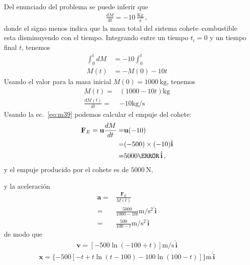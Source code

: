 Del enunciado del problema se puede inferir que
\begin{align}
  \frac{dM}{dt}=-10\ \frac{\text{Kg}}{\text{s}}\,,
\end{align}
donde el signo menos indica que la masa total del sistema cohete--combustible esta disminuyendo con el tiempo. Integrando entre un tiempo $t_i=0$ y un tiempo final $t$, tenemos
\begin{align}
  \int_0^t dM&=-10\int_0^t\nonumber\\
  M(t)&=-M(0)-10 t
\end{align}
Usando el valor para la masa inicial $M(0)=\SI{1000}{\kilo\gram}$, tenemos
\begin{align*}
  M(t)=&{(1000-10t)}\si{\kilo\gram}\nonumber\\
  \frac{dM(t)}{dt}=&-10\si{\kilo\gram\per\second}
\end{align*}
Usando la ec.~\eqref{eq:m39} podemos calcular el empuje del cohete:
\begin{align}
  \mathbf{F}_E=\mathbf{u}\frac{dM}{dt}=&\mathbf{u}(-10)\nonumber\\
  =&(-500)\timesm(-10)\hat{\mathbf{i}}\nonumber\\
  =&\SI{5000}{\newton}\,\hat{\mathbf{i}}\,,
\end{align}
y  el empuje producido por el cohete es de $\SI{5000}{\newton}$,  


y la aceleración
\begin{align}
  \mathbf{a}=&\frac{\mathbf{F}_E}{M(t)}\nonumber\\
  =&{\frac{5000}{1000-10t}}\si{\meter\per\second\squared}\,\hat{\mathbf{i}}\nonumber\\
  =&{\frac{500}{100-t}}\si{\meter\per\second\squared}\,\hat{\mathbf{i}}
\end{align}
de modo que
\begin{align}
  \textbf{v}={[-500\ln(-100+t)]}\si{\meter\per\second}\,\hat{\mathbf{i}}
\end{align}
\begin{align}
 \mathbf{x}={\{-500 [-t+t \ln (t-100)-100 \ln (100-t)]\}}\si{\meter}\,\hat{\mathbf{i}}
\end{align}
\finejemplo

